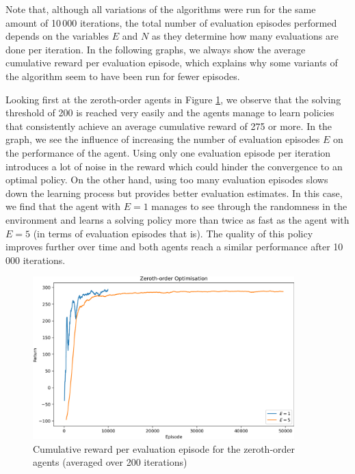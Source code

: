 \documentclass[10pt]{article}
\begin{document}
Note that, although all variations of the algorithms were run for the same amount of 10\,000 iterations, the total number
of evaluation episodes performed depends on the variables $E$ and $N$ as they determine how many evaluations
are done per iteration.
In the following graphs, we always show the average cumulative reward per evaluation episode, which explains why some
variants of the algorithm seem to have been run for fewer episodes.

Looking first at the zeroth-order agents in Figure \ref{fig:zeroth_order}, we observe that the solving threshold of 200 is reached very easily
and the agents manage to learn policies that consistently achieve an average cumulative reward of 275 or more.
In the graph, we see the influence of increasing the number of evaluation episodes $E$ on the performance of the agent. Using only one evaluation episode per iteration introduces a lot of noise in the reward which
could hinder the convergence to an optimal policy.
On the other hand, using too many evaluation episodes slows down the learning process but provides better
evaluation estimates.
In this case, we find that the agent with $E=1$ manages to see through the randomness in the environment and
learns a solving policy more than twice as fast as the agent with $E=5$ (in terms of evaluation episodes that is).
The quality of this policy improves further over time and both agents reach a similar performance after 10\,000 iterations.

\begin{figure}[h]
    \centering
    \includegraphics[width=0.9\textwidth]{checkpoints/FINAL/zeroth_order.png}
    \caption{Cumulative reward per evaluation episode for the zeroth-order agents (averaged over 200 iterations)}
    \label{fig:zeroth_order}
\end{figure}
\end{document}
